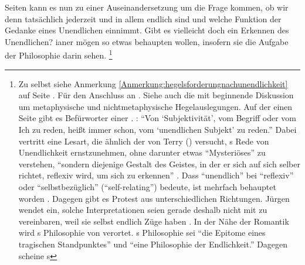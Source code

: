 Seiten kann es nun zu einer Auseinandersetzung um die Frage kommen, ob wir denn tatsächlich jederzeit
und in allem endlich sind und welche Funktion der Gedanke eines Unendlichen
einnimmt. Gibt es vielleicht doch ein Erkennen des Unendlichen?
ianer mögen so etwas behaupten wollen, insofern sie die Aufgabe der
Philosophie darin sehen.%
\footnote{\label{anmerkung:hegelsunendlichkeitinderdiskussion}Zu 
selbst siehe Anmerkung \ref{Anmerkung:hegelsforderungnachunendlichkeit} auf
Seite \pageref{Anmerkung:hegelsforderungnachunendlichkeit}. Für den Anschluss an
\cite[siehe
bspw.][]{Hutter:HegelsPhilosophiedesGeistes2007,Menegoni:DasEndlicheunddasUnendlicheinHegelsDenken2004,Pinkard:AgencyFinitudeandIdealism2003}.
Siehe auch die mit \textcite{Hartmann:Hegel1972} beginnende Diskussion um
metaphysische und nichtmetaphysische Hegelauslegungen. Auf der einen Seite gibt
es Befürworter einer .
\cite[Siehe bspw.][104]{Jaeschke:DieUnendlichkeitderSubjektivitaet2004}:
\enquote{Von \enquote{Subjektivität}, vom Begriff oder vom Ich zu reden, heißt
immer schon, vom \enquote{unendlichen Subjekt} zu reden.} Dabei vertritt
 eine Lesart, die ähnlich der von Terry 
(\cite[vgl.][\pno~261f.]{Pinkard:HegelsPhenomenology1994})
versucht, s Rede von Unendlichkeit ernstzunehmen, ohne darunter etwas \enquote{Mysteriöses} zu
verstehen, \enquote{sondern diejenige Gestalt des Geistes, in der er sich auf sich
selber richtet, reflexiv wird, um sich zu erkennen}
\parencite[][197]{Jaeschke:DasabsoluteWissen2004}. Dass \enquote{unendlich} bei
 \enquote{reflexiv} oder \enquote{selbstbezüglich} (\enquote{self-relating}) bedeute, ist
mehrfach behauptet worden \parencite[vgl.\ z.\,B.][]{Davis:HegelsIdealism2012}.
Dagegen gibt es Protest aus unterschiedlichen Richtungen. Jürgen  wendet
ein, solche Interpretationen seien gerade deshalb nicht mit  zu
vereinbaren, weil sie selbst endlich Züge haben
\parencite[vgl.][209--219]{Habermas:WegederDetranszendentalisierung2004}. In
der Nähe der Romantik wird s Philosophie von
 verortet.
s Philosophie sei \enquote{die Epitome eines tragischen Standpunktes} und
\enquote{eine Philosophie der Endlichkeit.} Dagegen scheine s
}
